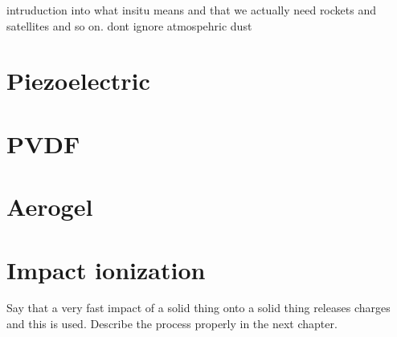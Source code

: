 intruduction into what insitu means and that we actually need rockets and satellites and so on. dont ignore atmospehric dust

\section{Piezoelectric}

\section{PVDF}

\section{Aerogel}

\section{Impact ionization}

Say that a very fast impact of a solid thing onto a solid thing releases charges and this is used. Describe the process properly in the next chapter.